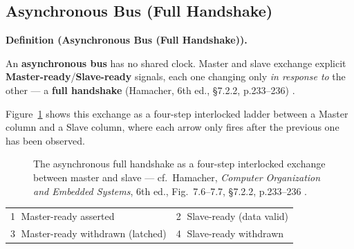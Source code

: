 \documentclass[11pt]{article}
\newenvironment{definitionbox}[1]{%
  \par\noindent\textbf{Definition (#1).}\ \itshape
}{\par\vspace{0.3em}}
\begin{document}
\subsection{Asynchronous Bus (Full Handshake)}

\begin{definitionbox}{Asynchronous Bus (Full Handshake)}
An \textbf{asynchronous bus} has no shared clock. Master and slave exchange explicit \textbf{Master-ready}/\textbf{Slave-ready} signals, each one changing only \emph{in response to} the other --- a \textbf{full handshake} (Hamacher, 6th ed., \S7.2.2, p.233--236) \cite{Hamacher2002_computer_organization}.
\end{definitionbox}

Figure~\ref{fig:async-bus} shows this exchange as a four-step interlocked ladder between a Master column and a Slave column, where each arrow only fires after the previous one has been observed.

\begin{figure}[h]
  \centering
  \caption{The asynchronous full handshake as a four-step interlocked exchange between master and slave --- cf.\ Hamacher, \textit{Computer Organization and Embedded Systems}, 6th ed., Fig.~7.6--7.7, \S7.2.2, p.233--236 \cite{Hamacher2002_computer_organization}.}
  \label{fig:async-bus}
\end{figure}

\begin{center}
\footnotesize
\begin{tabular}{@{}p{}p{}@{}}
  \textcircled{\scriptsize 1} Master-ready asserted &
  \textcircled{\scriptsize 2} Slave-ready (data valid) \\
  \textcircled{\scriptsize 3} Master-ready withdrawn (latched) &
  \textcircled{\scriptsize 4} Slave-ready withdrawn \\
\end{tabular}
\end{center}
\end{document}
